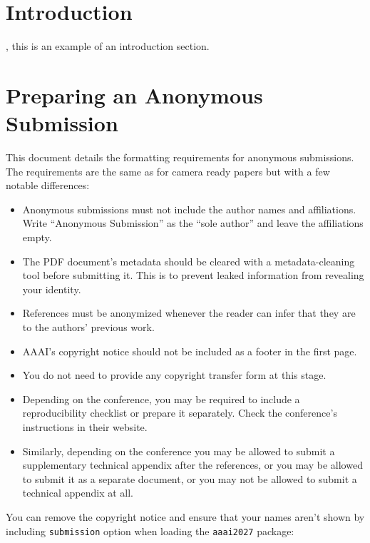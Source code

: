\section{Introduction} \label{sec:intro}

\ie, this is an example of an introduction section.




\section{Preparing an Anonymous Submission}

This document details the formatting requirements for anonymous submissions. The requirements are the same as for camera ready papers but with a few notable differences:

\begin{itemize}
    \item Anonymous submissions must not include the author names and affiliations. Write ``Anonymous Submission'' as the ``sole author'' and leave the affiliations empty.
    \item The PDF document's metadata should be cleared with a metadata-cleaning tool before submitting it. This is to prevent leaked information from revealing your identity.
    \item References must be anonymized whenever the reader can infer that they are to the authors' previous work.
    \item AAAI's copyright notice should not be included as a footer in the first page.
    \item You do not need to provide any copyright transfer form at this stage.
    \item Depending on the conference, you may be required to include a reproducibility checklist or prepare it separately. Check the conference's instructions in their website.
    \item Similarly, depending on the conference you may be allowed to submit a supplementary technical appendix after the references, or you may be allowed to submit it as a separate document, or you may not be allowed to submit a technical appendix at all.
\end{itemize}

You can remove the copyright notice and ensure that your names aren't shown by including \texttt{submission} option when loading the \texttt{aaai2027} package:

